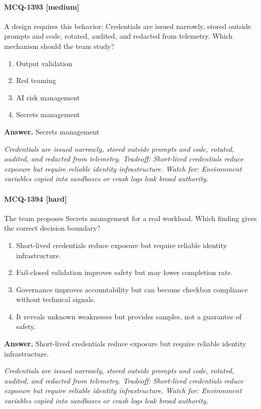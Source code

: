 \paragraph{MCQ-1393 [medium]} A design requires this behavior: Credentials are issued narrowly, stored outside prompts and code, rotated, audited, and redacted from telemetry. Which mechanism should the team study?
\begin{enumerate}[label=\Alph*.]
\item Output validation
\item Red teaming
\item AI risk management
\item Secrets management
\end{enumerate}
\noindent\textbf{Answer.} Secrets management
\par\textit{Credentials are issued narrowly, stored outside prompts and code, rotated, audited, and redacted from telemetry. Tradeoff: Short-lived credentials reduce exposure but require reliable identity infrastructure. Watch for: Environment variables copied into sandboxes or crash logs leak broad authority.}
\paragraph{MCQ-1394 [hard]} The team proposes Secrets management for a real workload. Which finding gives the correct decision boundary?
\begin{enumerate}[label=\Alph*.]
\item Short-lived credentials reduce exposure but require reliable identity infrastructure.
\item Fail-closed validation improves safety but may lower completion rate.
\item Governance improves accountability but can become checkbox compliance without technical signals.
\item It reveals unknown weaknesses but provides samples, not a guarantee of safety.
\end{enumerate}
\noindent\textbf{Answer.} Short-lived credentials reduce exposure but require reliable identity infrastructure.
\par\textit{Credentials are issued narrowly, stored outside prompts and code, rotated, audited, and redacted from telemetry. Tradeoff: Short-lived credentials reduce exposure but require reliable identity infrastructure. Watch for: Environment variables copied into sandboxes or crash logs leak broad authority.}
